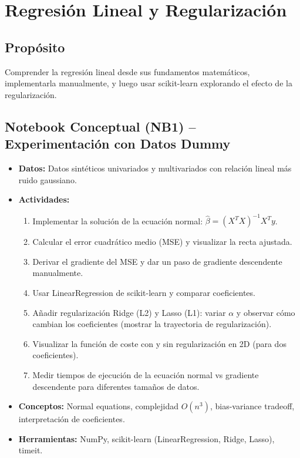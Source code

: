 \documentclass[12pt,a4paper]{article}
\begin{document}
\section{Regresión Lineal y Regularización}
\subsection*{Propósito}
Comprender la regresión lineal desde sus fundamentos matemáticos, implementarla manualmente, y luego usar scikit-learn explorando el efecto de la regularización.

\subsection*{Notebook Conceptual (NB1) – Experimentación con Datos Dummy}
\begin{itemize}
    \item \textbf{Datos:} Datos sintéticos univariados y multivariados con relación lineal más ruido gaussiano.
    \item \textbf{Actividades:}
    \begin{enumerate}
        \item Implementar la solución de la ecuación normal: $\hat{\beta} = (X^TX)^{-1}X^Ty$.
        \item Calcular el error cuadrático medio (MSE) y visualizar la recta ajustada.
        \item Derivar el gradiente del MSE y dar un paso de gradiente descendente manualmente.
        \item Usar LinearRegression de scikit-learn y comparar coeficientes.
        \item Añadir regularización Ridge (L2) y Lasso (L1): variar $\alpha$ y observar cómo cambian los coeficientes (mostrar la trayectoria de regularización).
        \item Visualizar la función de coste con y sin regularización en 2D (para dos coeficientes).
        \item Medir tiempos de ejecución de la ecuación normal vs gradiente descendente para diferentes tamaños de datos.
    \end{enumerate}
    \item \textbf{Conceptos:} Normal equations, complejidad $O(n^3)$, bias-variance tradeoff, interpretación de coeficientes.
    \item \textbf{Herramientas:} NumPy, scikit-learn (LinearRegression, Ridge, Lasso), timeit.
\end{itemize}
\end{document}
